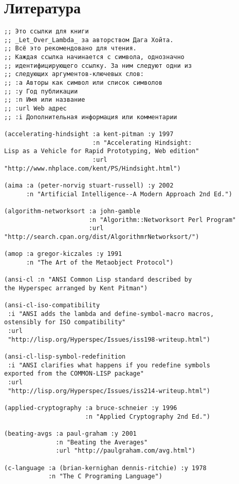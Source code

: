 \chapter*{Литература}

\begin{verbatim}
;; Это ссылки для книги
;; _Let_Over_Lambda_ за авторством Дага Хойта.
;; Всё это рекомендовано для чтения.
;; Каждая ссылка начинается с символа, однозначно
;; идентифицирующего ссылку. За ним следуют одни из
;; следующих аргументов-ключевых слов:
;; :a Авторы как символ или список символов
;; :y Год публикации
;; :n Имя или название
;; :url Web адрес
;; :i Дополнительная информация или комментарии

(accelerating-hindsight :a kent-pitman :y 1997
                        :n "Accelerating Hindsight:
Lisp as a Vehicle for Rapid Prototyping, Web edition"
                        :url
"http://www.nhplace.com/kent/PS/Hindsight.html")

(aima :a (peter-norvig stuart-russell) :y 2002
      :n "Artificial Intelligence--A Modern Approach 2nd Ed.")

(algorithm-networksort :a john-gamble
                       :n "Algorithm::Networksort Perl Program"
                       :url
"http://search.cpan.org/dist/AlgorithmrNetworksort/")

(amop :a gregor-kiczales :y 1991
      :n "The Art of the Metaobject Protocol")

(ansi-cl :n "ANSI Common Lisp standard described by
the Hyperspec arranged by Kent Pitman")

(ansi-cl-iso-compatibility
 :i "ANSI adds the lambda and define-symbol-macro macros,
ostensibly for ISO compatibility"
 :url
 "http://lisp.org/Hyperspec/Issues/iss198-writeup.html")

(ansi-cl-lisp-symbol-redefinition
 :i "ANSI clarifies what happens if you redefine symbols
exported from the COMMON-LISP package"
 :url
 "http://lisp.org/Hyperspec/Issues/iss214-writeup.html")

(applied-cryptography :a bruce-schneier :y 1996
                      :n "Applied Cryptography 2nd Ed.")

(beating-avgs :a paul-graham :y 2001
              :n "Beating the Averages"
              :url "http://paulgraham.com/avg.html")

(c-language :a (brian-kernighan dennis-ritchie) :y 1978
            :n "The C Programing Language")


\end{verbatim}
